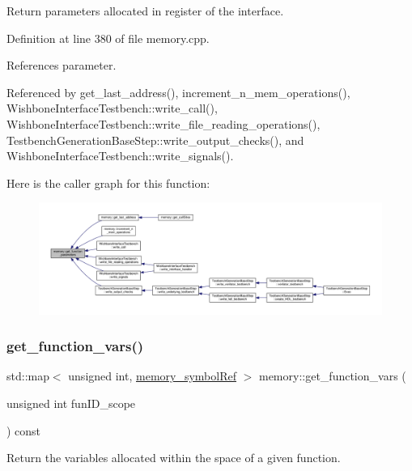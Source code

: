 Return parameters allocated in register of the interface. 



Definition at line 380 of file memory.\+cpp.



References parameter.



Referenced by get\+\_\+last\+\_\+address(), increment\+\_\+n\+\_\+mem\+\_\+operations(), Wishbone\+Interface\+Testbench\+::write\+\_\+call(), Wishbone\+Interface\+Testbench\+::write\+\_\+file\+\_\+reading\+\_\+operations(), Testbench\+Generation\+Base\+Step\+::write\+\_\+output\+\_\+checks(), and Wishbone\+Interface\+Testbench\+::write\+\_\+signals().

Here is the caller graph for this function\+:
\nopagebreak
\begin{figure}[H]
\begin{center}
\leavevmode
\includegraphics[width=350pt]{d8/d99/classmemory_a5d64e7ff7e95efad54bbfa07f58e18c1_icgraph}
\end{center}
\end{figure}
\mbox{\label{classmemory_a6ce2b973f83c743754cfa1bbe1b2a150}} 
\subsubsection{\texorpdfstring{get\+\_\+function\+\_\+vars()}{get\_function\_vars()}}
{\footnotesize\ttfamily std\+::map$<$ unsigned int, \hyperlink{memory__symbol_8hpp_af3608dbc27177447c2d777fa712cc82a}{memory\+\_\+symbol\+Ref} $>$ memory\+::get\+\_\+function\+\_\+vars (\begin{DoxyParamCaption}\item[{unsigned int}]{fun\+I\+D\+\_\+scope }\end{DoxyParamCaption}) const}



Return the variables allocated within the space of a given function. 



